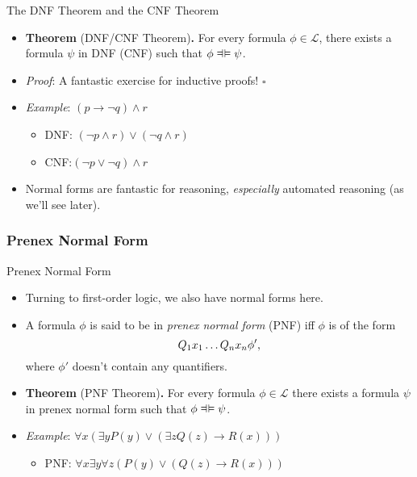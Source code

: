 \documentclass[../slides.tex]{subfiles}
\begin{document}
\begin{frame}{The DNF Theorem and the CNF Theorem}

  \begin{itemize}
  \item \textbf{Theorem} (DNF/CNF Theorem)\textbf{.} For every formula
    $\phi\in\mathcal{L}$, there exists a formula $\psi$ in DNF (CNF)
    such that $\phi\equi \psi$.

   \item \emph{Proof}: A fantastic exercise for inductive proofs! $\square$

  \item \emph{Example}:  $(p\to \neg q)\land r$

    \begin{itemize}

    \item DNF: $(\neg p\land r)\lor (\neg q\land r)$

      \item CNF:$(\neg p\lor \neg q)\land r$

      \end{itemize}

     \item Normal forms are fantastic for reasoning, \emph{especially}
       automated reasoning (as we'll see later). 
    
  \end{itemize}

\end{frame}

\subsubsection{Prenex Normal Form}
\begin{frame}{Prenex Normal Form}

  \begin{itemize}
  \item Turning to first-order logic, we also have normal forms here.

  \item A formula $\phi$ is said to be in \emph{prenex normal form}
    (PNF) 
    iff $\phi$ is of the form \[Q_1x_1\mathellipsis Q_nx_n\phi',\]
    where $\phi'$ doesn't contain any quantifiers.

   \item \textbf{Theorem} (PNF Theorem)\textbf{.} For every formula
   $\phi\in\mathcal{L}$ there exists a formula $\psi$ in prenex normal
   form such that $\phi\equi \psi$.

 \item \emph{Example}: $\forall x(\exists yP(y)\lor (\exists zQ(z)\to
   R(x)))$

   \begin{itemize}
   \item PNF: $\forall x\exists y\forall z(P(y)\lor (Q(z)\to R(x)))$
   \end{itemize}

  \end{itemize}
  
\end{frame}
\end{document}
